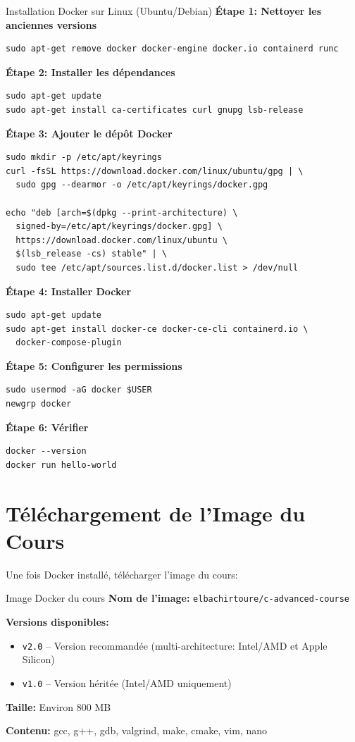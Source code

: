 \documentclass[10pt,a4paper]{article}
\begin{document}
\begin{exercicebox}{Installation Docker sur Linux (Ubuntu/Debian)}
\textbf{Étape 1: Nettoyer les anciennes versions}
\begin{verbatim}
sudo apt-get remove docker docker-engine docker.io containerd runc
\end{verbatim}

\textbf{Étape 2: Installer les dépendances}
\begin{verbatim}
sudo apt-get update
sudo apt-get install ca-certificates curl gnupg lsb-release
\end{verbatim}

\textbf{Étape 3: Ajouter le dépôt Docker}
\begin{verbatim}
sudo mkdir -p /etc/apt/keyrings
curl -fsSL https://download.docker.com/linux/ubuntu/gpg | \
  sudo gpg --dearmor -o /etc/apt/keyrings/docker.gpg

echo "deb [arch=$(dpkg --print-architecture) \
  signed-by=/etc/apt/keyrings/docker.gpg] \
  https://download.docker.com/linux/ubuntu \
  $(lsb_release -cs) stable" | \
  sudo tee /etc/apt/sources.list.d/docker.list > /dev/null
\end{verbatim}

\textbf{Étape 4: Installer Docker}
\begin{verbatim}
sudo apt-get update
sudo apt-get install docker-ce docker-ce-cli containerd.io \
  docker-compose-plugin
\end{verbatim}

\textbf{Étape 5: Configurer les permissions}
\begin{verbatim}
sudo usermod -aG docker $USER
newgrp docker
\end{verbatim}

\textbf{Étape 6: Vérifier}
\begin{verbatim}
docker --version
docker run hello-world
\end{verbatim}
\end{exercicebox}

\section{Téléchargement de l'Image du Cours}

Une fois Docker installé, télécharger l'image du cours:

\begin{infobox}{Image Docker du cours}
\textbf{Nom de l'image:} \texttt{elbachirtoure/c-advanced-course}

\textbf{Versions disponibles:}
\begin{itemize}
\item \texttt{v2.0} -- Version recommandée (multi-architecture: Intel/AMD et Apple Silicon)
\item \texttt{v1.0} -- Version héritée (Intel/AMD uniquement)
\end{itemize}

\textbf{Taille:} Environ 800 MB

\textbf{Contenu:} gcc, g++, gdb, valgrind, make, cmake, vim, nano
\end{infobox}
\end{document}
